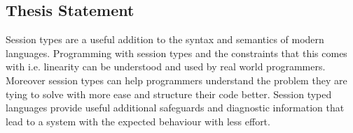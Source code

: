 \subsection{Thesis Statement}

Session types are a useful addition to the syntax and semantics of modern languages. Programming with session types and the constraints that this comes with i.e. linearity can be understood and used by real world programmers. Moreover session types can help programmers understand the problem they are tying to solve with more ease and structure their code better.
Session typed languages provide useful additional safeguards and diagnostic information that lead to a system with the expected behaviour with less effort.




%
%
%
%
